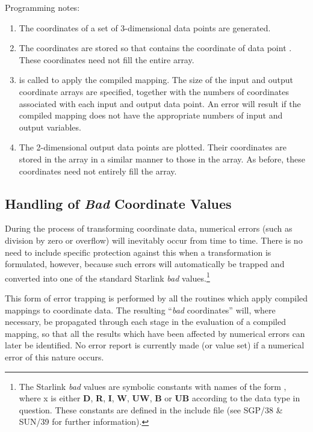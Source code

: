 Programming notes:

\begin{enumerate}

\item The coordinates of a set of 3-dimensional data points are generated.

\item The coordinates are stored so that  contains the
 coordinate of data point . 
These coordinates need not fill the entire array.

\item {} is called to apply the compiled mapping.
The size of the input and output coordinate arrays are specified, together
with the numbers of coordinates associated with each input and output data
point. 
An error will result if the compiled mapping does not have the appropriate
numbers of input and output variables. 

\item The 2-dimensional output data points are plotted.
Their coordinates are stored in the  array in a similar
manner to those in the  array. 
As before, these coordinates need not entirely fill the 
array. 

\end{enumerate}
\exampledone


\subsection{Handling of {\em Bad} Coordinate Values}

\label{section:additional:badvalues}

During the process of transforming coordinate data, numerical errors (such
as division by zero or overflow) will inevitably occur from time to time. 
There is no need to include specific protection against this when a
transformation is formulated, however, because such errors will
automatically be trapped and converted into one of the standard Starlink
{\em bad} values.\footnote{ 
The Starlink {\em bad} values are symbolic constants with names of the form
, where x is either {\bf D}, {\bf R}, {\bf I}, {\bf W},
{\bf UW}, {\bf B} or {\bf UB} according to the data type in question. 
These constants are defined in the include file  (see SGP/38
\& SUN/39 for further information).} 

This form of error trapping is performed by all the routines which apply
compiled mappings to coordinate data. 
The resulting ``{\em bad} coordinates'' will, where necessary, be propagated
through each stage in the evaluation of a compiled mapping, so that all the
results which have been affected by numerical errors can later be
identified. 
No error report is currently made (or  value set) if a
numerical error of this nature occurs. 

